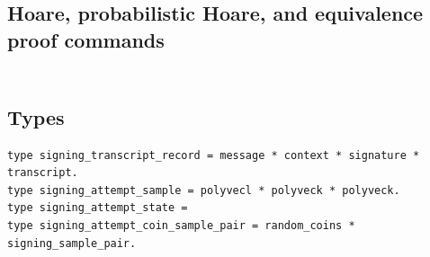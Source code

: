 \subsection*{Hoare, probabilistic Hoare, and equivalence proof commands}
\begin{lstlisting}[language=EasyCrypt,basicstyle=\ttfamily\tiny]
\end{lstlisting}

\section*{}

\subsection*{Types}
\begin{lstlisting}[language=EasyCrypt,basicstyle=\ttfamily\tiny]
type signing_transcript_record = message * context * signature * transcript.
type signing_attempt_sample = polyvecl * polyveck * polyveck.
type signing_attempt_state =
type signing_attempt_coin_sample_pair = random_coins * signing_sample_pair.
\end{lstlisting}

